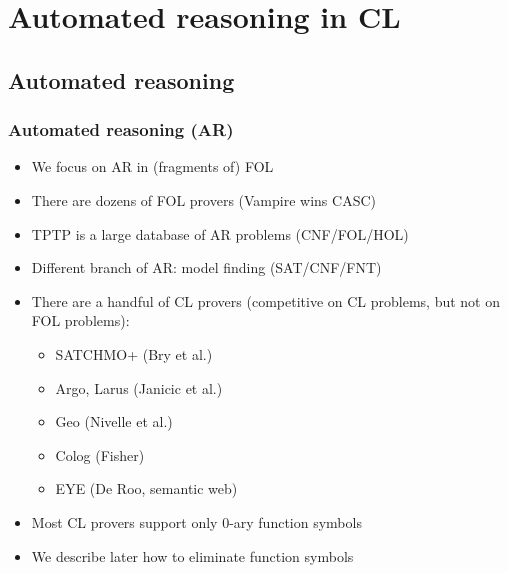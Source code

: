 \documentclass[handout,11pt]{beamer}
\begin{document}
\section{Automated reasoning in CL}

\subsection{Automated reasoning}

\begin{frame}
\frametitle{Automated reasoning (AR)}
 \begin{itemize}[<+->]   %
  \item We focus on AR in (fragments of) FOL
  \item There are dozens of FOL provers (Vampire wins CASC)
  \item TPTP is a large database of AR problems (CNF/FOL/HOL)
  \item Different branch of AR: model finding (SAT/CNF/FNT) 
  \item There are a handful of CL provers (competitive on
  CL problems, but not on FOL problems):
  \begin{itemize}[<+->]
   \item SATCHMO+ (Bry et al.)
   \item Argo, Larus (Janicic et al.)   
   \item Geo (Nivelle et al.)
   \item Colog (Fisher)   
   \item EYE (De Roo, semantic web) 
  \end{itemize}
  \item Most CL provers support only 0-ary function symbols
  \item We describe later how to eliminate function symbols
 \end{itemize}
\end{frame}
\end{document}
